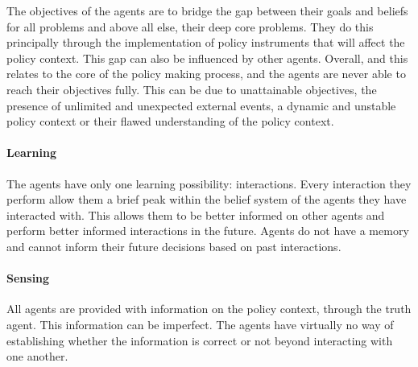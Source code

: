 The objectives of the agents are to bridge the gap between their goals and beliefs for all problems and above all else, their deep core problems. They do this principally through the implementation of policy instruments that will affect the policy context. This gap can also be influenced by other agents. Overall, and this relates to the core of the policy making process, and the agents are never able to reach their objectives fully. This can be due to unattainable objectives, the presence of unlimited and unexpected external events, a dynamic and unstable policy context or their flawed understanding of the policy context.

\paragraph{Learning}

The agents have only one learning possibility: interactions. Every interaction they perform allow them a brief peak within the belief system of the agents they have interacted with. This allows them to be better informed on other agents and perform better informed interactions in the future. Agents do not have a memory and cannot inform their future decisions based on past interactions.

\paragraph{Sensing}

All agents are provided with information on the policy context, through the truth agent. This information can be imperfect. The agents have virtually no way of establishing whether the information is correct or not beyond interacting with one another.

